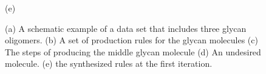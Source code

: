 \begin{figure}[ht!]
\begin{minipage}{0.75\linewidth}
    (e)
  \end{minipage}


  
  \vspace{-3mm}
  \caption{(a) A schematic example of a data set that includes three glycan oligomers.
    (b) A set of production rules for the glycan molecules
    (c) The steps of producing the middle glycan molecule
    (d) An undesired molecule.
    (e) the synthesized rules at the first iteration.
  }
  \label{fig:ex-gly}
\end{figure}

